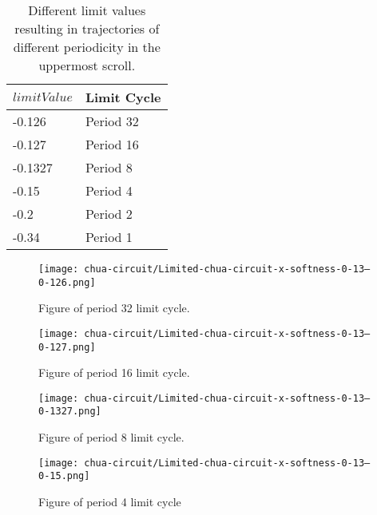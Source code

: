 \documentclass[main]{subfiles}
\begin{document}
\begin{table}[H]
\renewcommand{\arraystretch}{1.2}
\center
\begin{tabular}{@{}ll@{}}
	\toprule
   \(limitValue\) & Limit Cycle\\
   \midrule
   -0.126 & Period 32 \\
   -0.127 & Period 16 \\
   -0.1327 & Period 8 \\ 
   -0.15 & Period 4 \\
   -0.2  & Period 2 \\
   -0.34 & Period 1 \\
   \bottomrule
\end{tabular}
\caption[Limiter values for periodic trajectories for for an x self-limiting limiter with softness 0.13]{Different limit values resulting in trajectories of different periodicity in the uppermost scroll.}
\label{table:x-0.13-periodicities}
\end{table}

\begin{figure}[H]
\centering
\texttt{[image: chua-circuit/Limited-chua-circuit-x-softness-0-13--0-126.png]}
\caption[Figure of period 32 limit cycle]{Figure of period 32 limit cycle.}
\label{figure:x-0.13-32-limit-cycle-upperscroll-trajectory}
\end{figure}

\begin{figure}[H]
\centering
\texttt{[image: chua-circuit/Limited-chua-circuit-x-softness-0-13--0-127.png]}
\caption[Figure of period 16 limit cycle]{Figure of period 16 limit cycle.}
\label{figure:x-0.13-16-limit-cycle-upperscroll-trajectory}
\end{figure}

\begin{figure}[H]
\centering
\texttt{[image: chua-circuit/Limited-chua-circuit-x-softness-0-13--0-1327.png]}
\caption[Figure of period 8 limit cycle]{Figure of period 8 limit cycle.}
\label{figure:x-0.13-8-limit-cycle-upperscroll-trajectory}
\end{figure}

\begin{figure}[H]
\centering
\texttt{[image: chua-circuit/Limited-chua-circuit-x-softness-0-13--0-15.png]}
\caption[Figure of period 4 limit cycle]{Figure of period 4 limit cycle}
\label{figure:x-0.13-4-limit-cycle-upperscroll-trajectory}
\end{figure}
\end{document}

